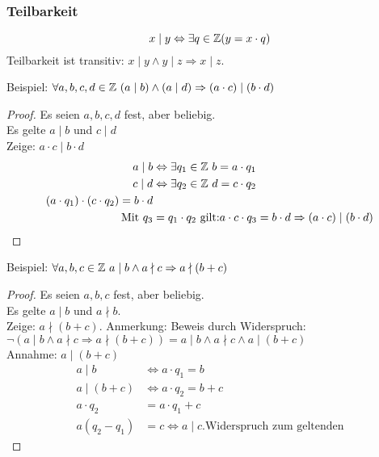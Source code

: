 \subsubsection{Teilbarkeit}
\begin{equation*}
	x \mid y \Leftrightarrow \exists q \in \mathbb{Z} (y = x \cdot q)
\end{equation*}
Teilbarkeit ist transitiv: $x \mid y \wedge y \mid z \Rightarrow x \mid z$.

Beispiel: $\forall a, b, c, d \in \mathbb{Z}\ (a \mid b) \wedge (a \mid d) \Rightarrow (a \cdot c) \mid (b \cdot d)$
\begin{proof}
	Es seien $a, b, c, d$ fest, aber beliebig.\\
	Es gelte $a \mid b$ und $c \mid d$\\
	Zeige: $a \cdot c \mid b \cdot d$\\
	\begin{align*}
		a \mid b & \Leftrightarrow \exists q_1 \in \mathbb{Z}\ b = a \cdot q_1\\
		c \mid d & \Leftrightarrow \exists q_2 \in \mathbb{Z}\ d = c \cdot q_2\\
		(a \cdot q_1) \cdot (c \cdot q_2) = b \cdot d\\
		\mbox{Mit }q_3 & = q_1 \cdot q_2 \mbox{ gilt:}
		a \cdot c \cdot q_3 = b \cdot d \Rightarrow (a \cdot c) \mid (b \cdot d)
	\end{align*}
\end{proof}

Beispiel: $\forall a, b, c \in \mathbb{Z}\ a \mid b \wedge a \nmid c \Rightarrow a \nmid (b + c)$
\begin{proof}
	Es seien $a, b, c$ fest, aber beliebig.\\
	Es gelte $a \mid b$ und $a \nmid b$.\\
	Zeige: $a \nmid (b + c)$.
	Anmerkung: Beweis durch Widerspruch: $\neg (a \mid b \wedge a \nmid c \Rightarrow a \nmid (b + c)) = a \mid b \wedge a \nmid c \wedge a \mid (b + c)$\\
	Annahme: $a \mid (b + c)$\\
	\begin{align*}
		a \mid b& \Leftrightarrow a \cdot q_1 = b\\
		a \mid (b + c) & \Leftrightarrow a \cdot q_2 = b + c\\
		a \cdot q_2& = a \cdot q_1 + c\\
		a (q_2 - q_1)& = c \Leftrightarrow a \mid c. \mbox{Widerspruch zum geltenden}
	\end{align*}
\end{proof}

